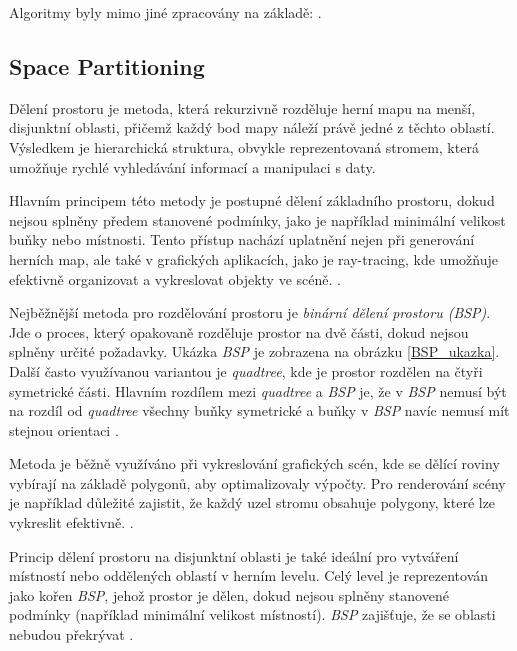 Algoritmy byly mimo jiné zpracovány na základě: \cite{PCGinG}.

\subsection{Space Partitioning}


Dělení prostoru je metoda, která rekurzivně rozděluje herní mapu na menší, disjunktní oblasti, přičemž každý bod mapy náleží právě jedné z těchto oblastí. Výsledkem je hierarchická struktura, obvykle reprezentovaná stromem, která umožňuje rychlé vyhledávání informací a manipulaci s daty.

Hlavním principem této metody je postupné dělení základního prostoru, dokud nejsou splněny předem stanovené podmínky, jako je například minimální velikost buňky nebo místnosti. Tento přístup nachází uplatnění nejen při generování herních map, ale také v grafických aplikacích, jako je ray-tracing, kde umožňuje efektivně organizovat a vykreslovat objekty ve scéně. \cite{PCGclanek}.

Nejběžnější metoda pro rozdělování prostoru je \textit{binární dělení prostoru (BSP)}. Jde o proces, který opakovaně rozděluje prostor na dvě části, dokud nejsou splněny určité požadavky. Ukázka \textit{BSP} je zobrazena na obrázku \vref{BSP_ukazka}. Další často využívanou variantou je \textit{quadtree}, kde je prostor rozdělen na čtyři symetrické části. Hlavním rozdílem mezi \textit{quadtree} a \textit{BSP} je, že v \textit{BSP} nemusí být na rozdíl od \textit{quadtree} všechny buňky symetrické a buňky v \textit{BSP} navíc nemusí mít stejnou orientaci \cite{BSPclanek}.

Metoda je běžně využíváno při vykreslování grafických scén, kde se dělící roviny vybírají na základě polygonů, aby optimalizovaly výpočty. Pro renderování scény je například důležité zajistit, že každý uzel stromu obsahuje polygony, které lze vykreslit efektivně. \cite{BSPclanek}.

Princip dělení prostoru na disjunktní oblasti je také ideální pro vytváření místností nebo oddělených oblastí v herním levelu. Celý level je reprezentován jako kořen \textit{BSP}, jehož prostor je dělen, dokud nejsou splněny stanovené podmínky (například minimální velikost místností). \textit{BSP} zajišťuje, že se oblasti nebudou překrývat \cite{PCGclanek}.

